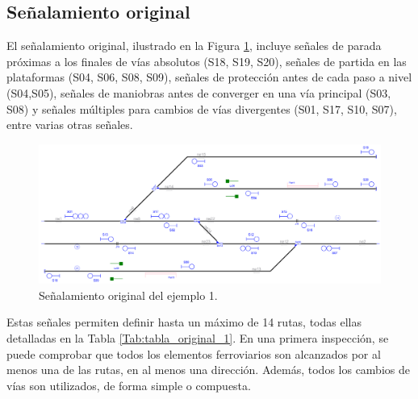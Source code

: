 \subsection{Señalamiento original}

    El señalamiento original, ilustrado en la Figura \ref{fig:EJ1_2}, incluye señales de parada próximas a los finales de vías absolutos (S18, S19, S20), señales de partida en las plataformas (S04, S06, S08, S09), señales de protección antes de cada paso a nivel (S04,S05), señales de maniobras antes de converger en una vía principal (S03, S08) y señales múltiples para cambios de vías divergentes (S01, S17, S10, S07), entre varias otras señales.
    
    \begin{figure}[H]
    	\centering
    	\includegraphics[width=1\textwidth]{resultados-obtenidos/ejemplo1/images/1_original.png}
    	\centering\caption{Señalamiento original del ejemplo 1.}
    	\label{fig:EJ1_2}
    \end{figure}
    
    Estas señales permiten definir hasta un máximo de 14 rutas, todas ellas detalladas en la Tabla \ref{Tab:tabla_original_1}. En una primera inspección, se puede comprobar que todos los elementos ferroviarios son alcanzados por al menos una de las rutas, en al menos una dirección. Además, todos los cambios de vías son utilizados, de forma simple o compuesta. 
    
